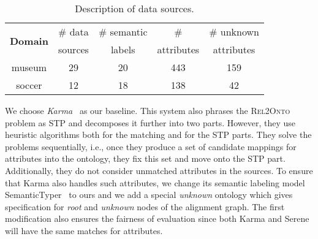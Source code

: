 \documentclass[letterpaper]{article} %
\newcommand{\relonto}{\textsc{Rel2Onto}}
\begin{document}
\begin{table}[ht]\small
  \centering
  \caption{Description of data sources.}\label{tab:data}
		\begin{tabular}{ccccc}
		\hline
		\multirow{2}{*}{\textbf{Domain}} & \# data & \# semantic & \# & \# unknown\\
		 & sources & labels & attributes & attributes\\
		\hline
		museum & 29 & 20 & 443 & 159  \\
		soccer & 12 & 18 & 138 & 42 \\
		\hline
		\end{tabular} 
\end{table}


We choose \emph{Karma}~\cite{taheriyan2016learning} as our baseline.
This system also phrases the \relonto{} problem as STP and decomposes it further into two parts.
However, they use heuristic algorithms both for the matching and for the STP parts.
They solve the problems sequentially, i.e., once they produce a set of candidate mappings for attributes into the ontology, they fix this set and move onto the STP part.
Additionally, they do not consider unmatched attributes in the sources.
To ensure that Karma also handles such attributes, we change its semantic labeling model SemanticTyper~\cite{Ramnandan:Assigning} to ours and we add a special \emph{unknown} ontology which gives specification for \emph{root} and \emph{unknown} nodes of the alignment graph.
The first modification also ensures the fairness of evaluation since both Karma and Serene will have the same matches for attributes.
\end{document}
